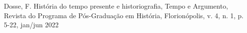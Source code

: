 \documentclass[
12pt,		%
openright,	%
twoside,  %
a4paper,			%
chapter=TITLE,		%
english,			%
french,				%
spanish,			%
brazil				%
]{USPSC-classe/USPSC}
\begin{document}
\begin{flushleft}
\begin{flushleft}
\begin{flushleft}
\begin{flushleft}
\begin{flushleft}
\begin{flushleft}
\begin{flushleft}
\begin{flushleft}
\begin{flushleft}
\begin{flushleft}
[DOSSE, 2012] Dosse, F. Hist\'oria do tempo presente e historiografia, Tempo e Argumento, Revista do Programa de P\'os-Gradua\c{c}\~ao em Hist\'oria, Florion\'opolis, v. 4, n. 1, p. 5-22, jan/jun 2022
\end{flushleft}


\end{flushleft}


\end{flushleft}


\end{flushleft}


\end{flushleft}


\end{flushleft}


\end{flushleft}


\end{flushleft}


\end{flushleft}


\end{flushleft}
\end{document}
